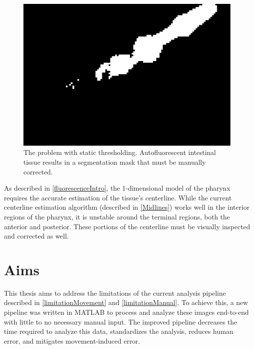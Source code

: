 \begin{figure}[ht]
    \centering
    \includegraphics[scale=.25]{Figures/rendered_files/segmentation_naive}
    \decoRule
    \caption[The problem with static thresholding]{The problem with static thresholding. Autofluorescent intestinal tissue results in a segmentation mask that must be manually corrected.}
    \label{fig:SegmentationNaive}
\end{figure}

As described in \ref{fluorescenceIntro}, the 1-dimensional model of the pharynx requires the accurate estimation of the tissue's centerline. While the current centerline estimation algorithm (described in \ref{Midlines}) works well in the interior regions of the pharynx, it is unstable around the terminal regions, both the anterior and posterior. These portions of the centerline must be visually inspected and corrected as well.

\section{Aims}
This thesis aims to address the limitations of the current analysis pipeline described in \ref{limitationMovement} and \ref{limitationManual}. To achieve this, a new pipeline was written in MATLAB to process and analyze these images end-to-end with little to no necessary manual input. The improved pipeline decreases the time required to analyze this data, standardizes the analysis, reduces human error, and mitigates movement-induced error.